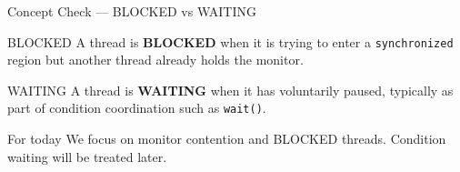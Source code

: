 \documentclass[aspectratio=169,11pt]{beamer}
\begin{document}
	\begin{frame}{Concept Check --- BLOCKED vs WAITING}
		\begin{block}{BLOCKED}
			A thread is \textbf{BLOCKED} when it is trying to enter a
			\texttt{synchronized} region but another thread already holds the monitor.
		\end{block}
		
		\vspace{0.3cm}
		\begin{block}{WAITING}
			A thread is \textbf{WAITING} when it has voluntarily paused,
			typically as part of condition coordination such as \texttt{wait()}.
		\end{block}
		
		\vspace{0.3cm}
		\begin{alertblock}{For today}
			We focus on monitor contention and BLOCKED threads.
			Condition waiting will be treated later.
		\end{alertblock}
	\end{frame}
\end{document}
